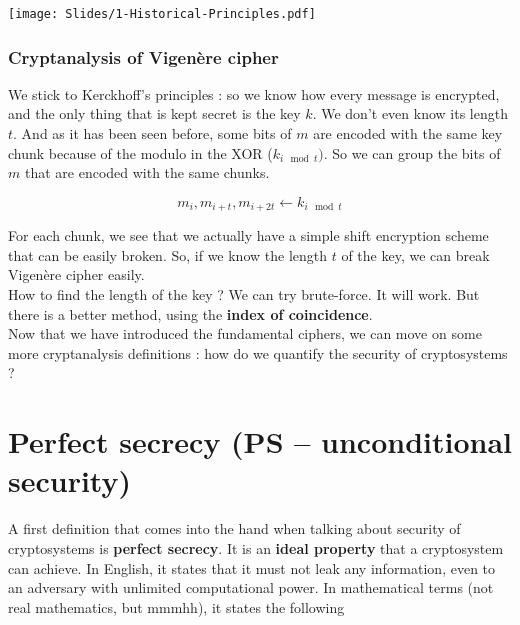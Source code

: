 \documentclass[a4paper, 12pt]{book}
\begin{document}
\begin{center}
    \texttt{[image: Slides/1-Historical-Principles.pdf]}
\end{center}

\subsubsection{Cryptanalysis of Vigenère cipher}
We stick to Kerckhoff's principles : so we know how every message is encrypted, and the only thing that is kept secret is the key $k$. We don't even know its length $t$. And as it has been seen before, some bits of $m$ are encoded with the same key chunk because of the modulo in the XOR ($k_{i\mod t})$. So we can group the bits of $m$ that are encoded with the same chunks.

$$m_i, m_{i+ t}, m_{i+2t} \longleftarrow k_{i\mod t}$$

For each chunk, we see that we actually have a simple shift encryption scheme that can be easily broken. So, if we know the length $t$ of the key, we can break Vigenère cipher easily. \\

How to find the length of the key ? We can try brute-force. It will work. But there is a better method, using the \textbf{index of coincidence}. \\

Now that we have introduced the fundamental ciphers, we can move on some more cryptanalysis definitions : how do we quantify the security of cryptosystems ?


\section{Perfect secrecy (PS -- unconditional security)}
A first definition that comes into the hand when talking about security of cryptosystems is \textbf{perfect secrecy}. It is an \textbf{ideal property} that a cryptosystem can achieve. In English, it states that it must not leak any information, even to an adversary with unlimited computational power. In mathematical terms (not real mathematics, but mmmhh), it states the following 
\end{document}
